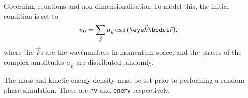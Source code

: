 \begin{chapter}{\label{cha:equations}Governing equations and
  non-dimensionalisation}
  To model this, the initial condition is set to
  \begin{equation*}
    \psi_{0} = \sum_{\vec{k}} a_{\vec{k}} \exp{(\eye\vec{k}\bcdot\vec{r})},
  \end{equation*}
  where the $\vec{k}$s are the wavenumbers in momentum space, and the phases of
  the complex amplitudes $a_{\vec{k}}$ are distributed randomly.

  The mass and kinetic energy density must be set prior to performing a random
  phase simulation.  These are \verb"nv" and \verb"enerv" respectively.

\end{chapter}
